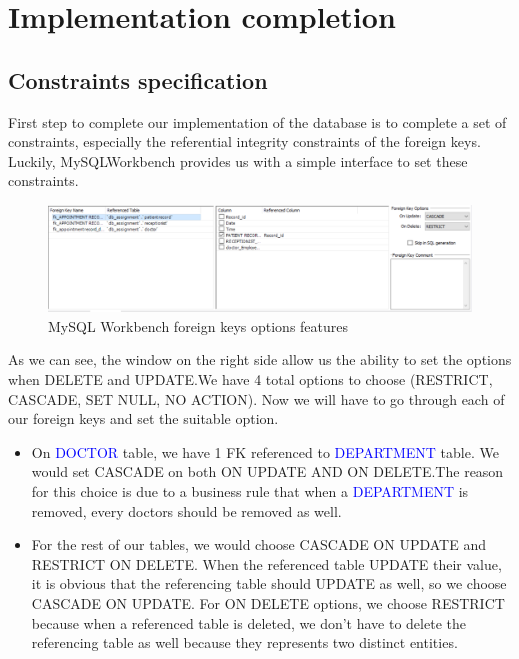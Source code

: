 \section{Implementation completion}

\subsection{Constraints specification}
First step to complete our implementation of the database is to complete a set of constraints, especially the referential integrity constraints of the foreign keys. Luckily, MySQLWorkbench provides us with a simple interface to set these constraints.

\begin{figure}[H]
    \centering
    \includegraphics[width = 12cm]{assets/constraints_1.png}
    \captionsetup{justification=centering,margin=2cm}
    \caption{MySQL Workbench foreign keys options features}
\end{figure}

As we can see, the window on the right side allow us the ability to set the options when DELETE and UPDATE.We have 4 total options to choose (RESTRICT, CASCADE, SET NULL, NO ACTION). Now we will have to go through each of our foreign keys and set the suitable option.

\begin{itemize}
    \item On \textcolor{blue}{DOCTOR} table, we have 1 FK referenced to \textcolor{blue}{DEPARTMENT} table. We would set CASCADE on both ON UPDATE AND ON DELETE.The reason for this choice is due to a business rule that when a \textcolor{blue}{DEPARTMENT} is removed, every doctors should be removed as well.
    \item For the rest of our tables, we would choose CASCADE ON UPDATE and RESTRICT ON DELETE. When the referenced table UPDATE their value, it is obvious that the referencing table should UPDATE as well, so we choose CASCADE ON UPDATE. For ON DELETE options, we choose RESTRICT because when a referenced table is deleted, we don't have to delete the referencing table as well because they represents two distinct entities.
\end{itemize}

